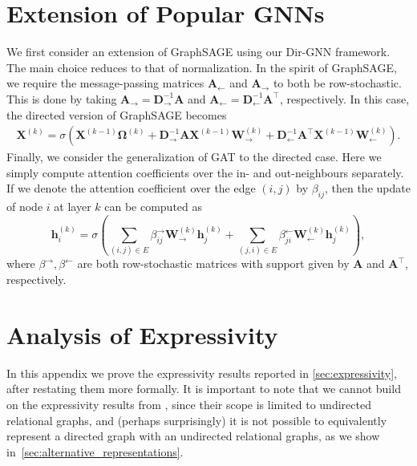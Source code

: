 \documentclass{article}
\newcommand{\inp}{\leftarrow}
\newcommand{\out}{\rightarrow}
\newcommand\oursacro{Dir-GNN}
\theoremstyle{plain}
\theoremstyle{definition}
\theoremstyle{remark}
\begin{document}
\section{Extension of Popular GNNs} \label{app:extensions}
We first consider an extension of GraphSAGE \cite{hamilton2017inductive} using our \oursacro{} framework. The main choice reduces to that of normalization. In the spirit of GraphSAGE, we require the message-passing matrices $\mathbf{A}_{\inp}$ and $\mathbf{A}_{\out}$ to both be row-stochastic. This is done by taking $\mathbf{A}_{\out} = \mathbf{D}_{\out}^{-1}\mathbf{A}$ and $\mathbf{A}_{\inp} = \mathbf{D}_{\inp}^{-1}\mathbf{A}^\top$, respectively. In this case, the directed version of GraphSAGE becomes
\begin{align*}\label{eq:dir-sage}
    \mathbf{X}^{(k)} =  \sigma(\mathbf{X}^{(k-1)}\mathbf{\Omega}^{(k)} + \mathbf{D}_{\out}^{-1}\mathbf{A}\mathbf{X}^{(k-1)}\mathbf{W}^{(k)}_{\out} + \mathbf{D}_{\inp}^{-1}\mathbf{A}^\top\mathbf{X}^{(k-1)}\mathbf{W}^{(k)}_{\inp}). 
\end{align*}
\noindent Finally, we consider the generalization of GAT \cite{velivckovic2017graph} to the directed case. Here we simply compute attention coefficients over the in- and out-neighbours separately. If we denote the attention coefficient over the edge $(i,j)$ by $\beta_{ij}$, then the update of node $i$ at layer $k$ can be computed as 
\begin{equation*}\label{eq:dir-gat}
    \mathbf{h}_i^{(k)} = \sigma(\sum_{(i,j)\in E}\beta_{ij}^\out \mathbf{W}^{(k)}_{\out}\mathbf{h}_{j}^{(k)} +  \sum_{(j,i)\in E}\beta_{ji}^\inp \mathbf{W}^{(k)}_{\inp}\mathbf{h}_{j}^{(k)}),
\end{equation*}
\noindent where $\beta^\out,\beta^\inp$ are both row-stochastic matrices with support given by $\mathbf{A}$ and $\mathbf{A}^\top$, respectively.



\section{Analysis of Expressivity} \label{app:expressivity_analysis}

In this appendix we prove the expressivity results reported in \cref{sec:expressivity}, after restating them more formally. It is important to note that we cannot build on the expressivity results from \citet{barcelo2022weisfeiler}, since their scope is limited to undirected relational graphs, and (perhaps surprisingly) it is not possible to equivalently represent a directed graph with an undirected relational graphs, as we show in~\cref{sec:alternative_representations}. 
\end{document}
